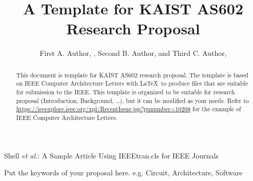 \documentclass[journal,9pt]{IEEEtran}
\begin{document}
\title{A Template for KAIST AS602 Research Proposal}

\author{First A. Author, , Second B. Author, and Third C. Author, 

}

%
{Shell \MakeLowercase{\textit{et al.}}: A Sample Article Using IEEEtran.cls for IEEE Journals}


\maketitle
\begin{abstract}
  This document is template for KAIST AS602 research proposal.
  The template is based on IEEE Computer Architecture Letters with \LaTeX \ to produce files that are suitable for submission to the IEEE.
  This template is organized to be suitable for research proposal (Introduction, Background, \dots), but it can be modified as your needs.
  Refer to \url{https://ieeexplore.ieee.org/xpl/RecentIssue.jsp?punumber=10208} for the example of IEEE Computer Architecture Letters.
\end{abstract}

\begin{IEEEkeywords}
  Put the keywords of your proposal here. e.g. Circuit, Architecture, Software
\end{IEEEkeywords}
\end{document}
